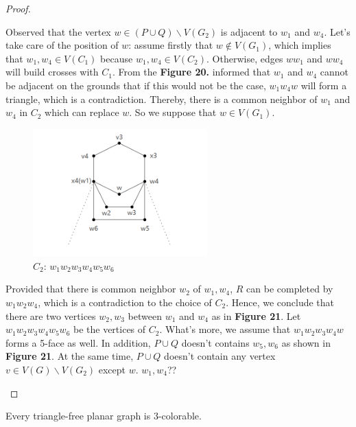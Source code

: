 \begin{proof}
\begin{itemize}
\begin{figure}[H]
    \label{figure} %
    \end{figure}
Observed that the vertex $w \in (P \cup Q) \backslash V(G_2)$ is adjacent to $w_1$ and $w_4$. Let's take care of the position of $w$: assume firstly that $w \notin V(G_1)$, which implies that $w_1, w_4 \in V(C_1)$ because $w_1, w_4 \in V(C_2)$. Otherwise, edges $ww_1$ and $ww_4$ will build crosses with $C_1$. From the \textbf{Figure 20.} informed that $w_1$ and $w_4$ cannot be adjacent on the grounds that if this would not be the case, $w_1w_4w$ will form a triangle, which is a contradiction. Thereby, there is a common neighbor of $w_1$ and $w_4$ in $C_2$ which can replace $w$. So we suppose that $w \in V(G_1)$.

\begin{figure}[H] %
    \centering %
    \includegraphics[width=0.6\textwidth]{figure/temp1.png} 
    \caption{$C_2$: $w_1w_2w_3w_4w_5w_6$ } %
    \label{figure} %
\end{figure}
Provided that there is common neighbor $w_2$ of $w_1, w_4$, $R$ can be completed by $w_1w_2w_4$, which is a contradiction to the choice of $C_2$. Hence, we conclude that there are two vertices $w_2, w_3$ between $w_1$ and $w_4$ as in \textbf{Figure 21}. Let $w_1w_2w_3w_4w_5w_6$ be the vertices of $C_2$. What's more, we assume that $w_1w_2w_3w_4w$ forms a 5-face as well. In addition, $P \cup Q$ doesn't contains $w_5, w_6$ as shown in \textbf{Figure 21}. At the same time, $P \cup Q$ doesn't contain any vertex $v \in V(G) \backslash V(G_2)$ except $w$. $w_1, w_4$??
\end{itemize}
\end{proof}
\begin{theorem}
Every triangle-free planar graph is 3-colorable. \cite{grotzsch1959dreifarbensatz}
\end{theorem}

